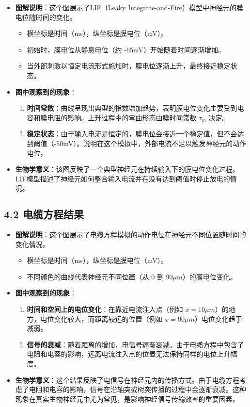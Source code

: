\documentclass[12pt]{article}
\begin{document}
\begin{itemize}
    \item \textbf{图解说明}：这个图展示了LIF（Leaky Integrate-and-Fire）模型中神经元的膜电位随时间的变化。
    \begin{itemize}
        \item 横坐标是时间（ms），纵坐标是膜电位（mV）。
        \item 初始时，膜电位从静息电位（约 -65mV）开始随着时间逐渐增加。
        \item 当外部刺激以恒定电流形式施加时，膜电位逐渐上升，最终接近稳定状态。
    \end{itemize}
    \item \textbf{图中观察到的现象}：
    \begin{enumerate}
        \item \textbf{时间常数}：曲线呈现出典型的指数增加趋势，表明膜电位变化主要受到电容和膜电阻的影响。上升过程中的弯曲形态由膜时间常数 $\tau_m$ 决定。
        \item \textbf{稳定状态}：由于输入电流是恒定的，膜电位会接近一个稳定值，但不会达到阈值（-50mV）。说明在这个模拟中，外部电流不足以触发神经元的动作电位。
    \end{enumerate}
    \item \textbf{生物学意义}：该图反映了一个典型神经元在持续输入下的膜电位变化过程。LIF模型描述了神经元如何整合输入电流并在没有达到阈值时停止放电的情况。
\end{itemize}

\subsection*{4.2 电缆方程结果}

\begin{itemize}
    \item \textbf{图解说明}：这个图展示了电缆方程模拟的动作电位在神经元不同位置随时间的变化情况。
    \begin{itemize}
        \item 横坐标是时间（ms），纵坐标是膜电位（mV）。
        \item 不同颜色的曲线代表神经元不同位置（从 0 到 90$\mu$m）的膜电位变化。
    \end{itemize}
    \item \textbf{图中观察到的现象}：
    \begin{enumerate}
        \item \textbf{时间和空间上的电位变化}：在靠近电流注入点（例如 $x=10\mu m$）的地方，电位变化较大，而距离较远的位置（例如 $x=90\mu m$）电位变化趋于减弱。
        \item \textbf{信号的衰减}：随着距离的增加，电信号逐渐衰减。由于电缆方程中包含了电阻和电容的影响，远离电流注入点的位置无法保持同样的电位上升幅度。
    \end{enumerate}
    \item \textbf{生物学意义}：这个结果反映了电信号在神经元内的传播方式。由于电缆方程考虑了电阻和电容的影响，信号在沿轴突或树突传播的过程中会逐渐衰减。这种现象在真实生物神经元中尤为常见，是影响神经信号传输效率的重要因素。
\end{itemize}
\end{document}
